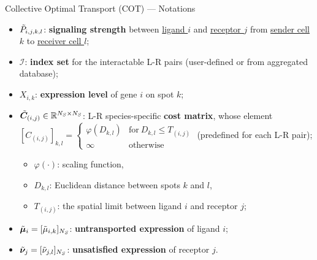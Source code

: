\documentclass[10pt]{beamer}
\begin{document}
\begin{frame}{Collective Optimal Transport (COT)
--- Notations}
    \begin{itemize}
        \item ${\Tilde{P}_{i,j,k,l}}$:  \textbf{signaling strength} between \uline{ligand $i$} and \uline{receptor $j$} from \uline{sender cell $k$} to \uline{receiver cell $l$}; \\
        \item ${\mathcal{I}}$: \textbf{index set} for the interactable L-R pairs (user-defined or from aggregated database); \\
        \item ${X_{i,k}}$: \textbf{expression level} of gene $i$ on spot $k$; \\
        \item ${\Tilde{\bm{C}}_{(i,j)}\in\mathbb{R}^{N_S\times N_S}}$: L-R species-specific \textbf{cost matrix}, whose element $[C_{(i,j)}]_{k,l}=\begin{cases}
            \varphi(D_{k,l}) & \text{for}~D_{k,l} \leq T_{(i,j)} \\
            \infty & \text{otherwise}
        \end{cases}$ (predefined for each L-R pair);
        \begin{itemize}
            \item $\varphi(\cdot)$: scaling function,
            \item $D_{k,l}$: Euclidean distance between spots $k$ and $l$,  
            \item $T_{(i,j)}$: the spatial limit between ligand $i$ and receptor $j$;
        \end{itemize}
        \item $\Tilde{\bm{\mu}}_i=[\Tilde{\mu}_{i,k}]_{N_S}$: \textbf{untransported expression} of ligand $i$;
        \item $\Tilde{\bm{\nu}}_j=[\Tilde{\nu}_{j,l}]_{N_S}$: \textbf{unsatisfied expression} of receptor $j$.
    \end{itemize}
\end{frame}


\end{document}
